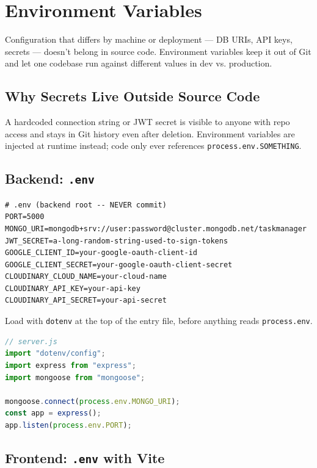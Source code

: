 \chapter{Environment Variables}

Configuration that differs by machine or deployment --- DB URIs, API keys,
secrets --- doesn't belong in source code. Environment variables keep it
out of Git and let one codebase run against different values in dev vs.
production.

\section{Why Secrets Live Outside Source Code}

A hardcoded connection string or JWT secret is visible to anyone with repo
access and stays in Git history even after deletion. Environment variables
are injected at runtime instead; code only ever references
\texttt{process.env.SOMETHING}.

\section{Backend: \texttt{.env}}

\begin{lstlisting}
# .env (backend root -- NEVER commit)
PORT=5000
MONGO_URI=mongodb+srv://user:password@cluster.mongodb.net/taskmanager
JWT_SECRET=a-long-random-string-used-to-sign-tokens
GOOGLE_CLIENT_ID=your-google-oauth-client-id
GOOGLE_CLIENT_SECRET=your-google-oauth-client-secret
CLOUDINARY_CLOUD_NAME=your-cloud-name
CLOUDINARY_API_KEY=your-api-key
CLOUDINARY_API_SECRET=your-api-secret
\end{lstlisting}

Load with \texttt{dotenv} at the top of the entry file, before anything
reads \texttt{process.env}.

\begin{lstlisting}[language=JavaScript]
// server.js
import "dotenv/config";
import express from "express";
import mongoose from "mongoose";

mongoose.connect(process.env.MONGO_URI);
const app = express();
app.listen(process.env.PORT);
\end{lstlisting}

\section{Frontend: \texttt{.env} with Vite}

